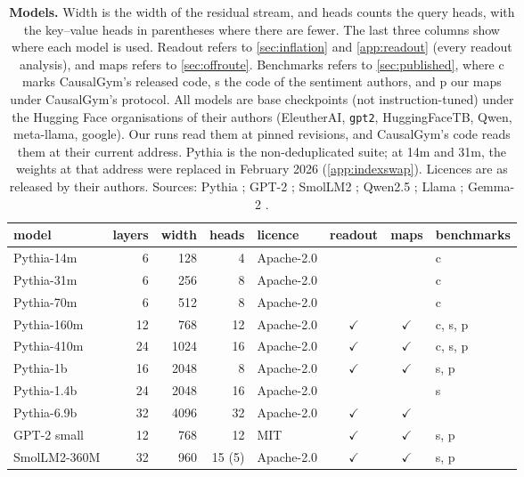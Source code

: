 \begin{table}[tbp]
  \caption{\textbf{Models.} Width is the width of the residual stream, and heads counts the query heads, with the key--value
  heads in parentheses where there are fewer. The last three columns show where each model is used. Readout refers to
  \cref{sec:inflation} and \cref{app:readout} (every readout analysis), and maps refers to \cref{sec:offroute}. Benchmarks
  refers to \cref{sec:published}, where c marks CausalGym's released code, s the code of the sentiment authors, and p our
  maps under CausalGym's protocol. All models are base checkpoints (not instruction-tuned) under the Hugging Face
  organisations of their authors (EleutherAI, \texttt{gpt2}, HuggingFaceTB, Qwen, meta-llama, google). Our runs read them at
  pinned revisions, and CausalGym's code reads them at their current address. Pythia is the non-deduplicated suite; at 14m
  and 31m, the weights at that address were replaced in February 2026 (\cref{app:indexswap}). Licences are as released by
  their authors. Sources: Pythia \citep{biderman2023}; GPT-2 \citep{radford2019}; SmolLM2 \citep{allal2025}; Qwen2.5 \citep{qwen2024}; Llama \citep{dubey2025}; Gemma-2 \citep{team2024}.}
  \label{tab:models}
  \centering
  \footnotesize
  \setlength{\tabcolsep}{4pt}
  \begin{tabular}{@{}lrrrlccl@{}}
    \toprule
    model & layers & width & heads & licence & readout & maps & benchmarks \\
    \midrule
    Pythia-14m & 6 & 128 & 4 & Apache-2.0 &  &  & c \\
    Pythia-31m & 6 & 256 & 8 & Apache-2.0 &  &  & c \\
    Pythia-70m & 6 & 512 & 8 & Apache-2.0 &  &  & c \\
    Pythia-160m & 12 & 768 & 12 & Apache-2.0 & $\checkmark$ & $\checkmark$ & c, s, p \\
    Pythia-410m & 24 & 1024 & 16 & Apache-2.0 & $\checkmark$ & $\checkmark$ & c, s, p \\
    Pythia-1b & 16 & 2048 & 8 & Apache-2.0 & $\checkmark$ & $\checkmark$ & s, p \\
    Pythia-1.4b & 24 & 2048 & 16 & Apache-2.0 &  &  & s \\
    Pythia-6.9b & 32 & 4096 & 32 & Apache-2.0 & $\checkmark$ & $\checkmark$ &  \\
    GPT-2 small & 12 & 768 & 12 & MIT & $\checkmark$ & $\checkmark$ & s, p \\
    SmolLM2-360M & 32 & 960 & 15 (5) & Apache-2.0 & $\checkmark$ & $\checkmark$ & s, p \\

\end{tabular}
\end{table}

